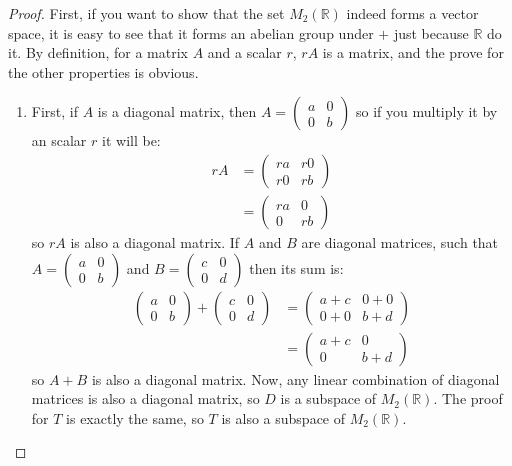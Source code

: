 \documentclass{tufte-handout}
\begin{document}
\begin{proof}
	First, if you want to show that the set $M_2(\mathbb{R})$ indeed forms a vector space, it is easy to see that it forms an abelian group under $+$ just because $\mathbb{R}$ do it. By definition, for a matrix $A$ and a scalar $r$, $rA$ is a matrix, and the prove for the other properties is obvious.\\

	\begin{enumerate}
		\item First, if $A$ is a diagonal matrix, then $A = \begin{pmatrix}
			a & 0\\0 & b
		\end{pmatrix}$ so if you multiply it by an scalar $r$ it will be:
		\begin{align*}
			rA &= \begin{pmatrix}
				ra & r0\\ r0 & rb
			\end{pmatrix}\\
			&=\begin{pmatrix}
				ra & 0\\ 0 & rb
			\end{pmatrix}
		\end{align*} 
		so $rA$ is also a diagonal matrix. If $A$ and $B$ are diagonal matrices, such that $A = \begin{pmatrix}
			a & 0\\ 0 & b
		\end{pmatrix}$ and $B = \begin{pmatrix}
			c & 0\\ 0 & d
		\end{pmatrix}$
		then its sum is:
		\begin{align*}
			\begin{pmatrix}
				a & 0\\ 0 & b
			\end{pmatrix} + \begin{pmatrix}
				c & 0\\ 0 & d
			\end{pmatrix} &= \begin{pmatrix}
				a + c & 0 + 0\\ 0 + 0 & b + d
			\end{pmatrix}\\
			&= \begin{pmatrix}
				a + c & 0 \\ 0 & b + d
			\end{pmatrix}
		\end{align*}
		so $A+B$ is also a diagonal matrix. Now, any linear combination of diagonal matrices is also a diagonal matrix, so $D$ is a subspace of $M_2(\mathbb{R})$. The proof for $T$ is exactly the same, so $T$ is also a subspace of $M_2(\mathbb{R})$.


\end{enumerate}
\end{proof}
\end{document}
